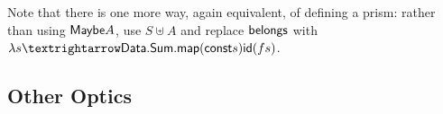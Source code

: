 \documentclass[sigplan,review,anonymous]{acmart}\settopmatter{printfolios=true,printccs=false,printacmref=false}
\begin{document}
{\begin{code}
\AgdaSymbol{(}\AgdaSpace{}%
\AgdaSymbol{)}\AgdaSpace{}%
\AgdaSpace{}%
\AgdaSpace{}%
\AgdaSpace{}%
\AgdaSymbol{(}\AgdaSpace{}%
\AgdaSpace{}%
\AgdaSymbol{)}\AgdaSpace{}%
\AgdaSymbol{|}\AgdaSpace{}%
\AgdaSpace{}%
\AgdaSymbol{(}\AgdaSpace{}%
\AgdaSymbol{)}\AgdaSpace{}%
\AgdaSymbol{(}\AgdaSpace{}%
\AgdaSpace{}%
\AgdaSymbol{)}\<%
\\
%
\>[4]\AgdaSpace{}%
\AgdaSymbol{(}\AgdaSpace{}%
\AgdaSymbol{)}\AgdaSpace{}%
\AgdaSymbol{|}\AgdaSpace{}%
\AgdaSpace{}%
\AgdaSpace{}%
\AgdaSymbol{|}\AgdaSpace{}%
\AgdaOperator{\AgdaInductiveConstructor{[}}\AgdaSpace{}%
\AgdaSpace{}%
\AgdaOperator{\AgdaInductiveConstructor{]}}\AgdaSpace{}%
\AgdaSymbol{=}\AgdaSpace{}%
\AgdaSpace{}%
\AgdaSymbol{(}\AgdaSpace{}%
\AgdaSymbol{(}\AgdaSpace{}%
\AgdaSymbol{)}\AgdaSpace{}%
\AgdaSymbol{(}\AgdaSpace{}%
\AgdaSpace{}%
\AgdaSymbol{))}\<%
\\
%
\>[4]\AgdaSpace{}%
\AgdaSymbol{(}\AgdaSpace{}%
\AgdaSymbol{)}\AgdaSpace{}%
\AgdaSymbol{|}\AgdaSpace{}%
\AgdaSpace{}%
\AgdaSymbol{|}\AgdaSpace{}%
\AgdaOperator{\AgdaInductiveConstructor{[}}\AgdaSpace{}%
\AgdaSpace{}%
\AgdaOperator{\AgdaInductiveConstructor{]}}\AgdaSpace{}%
\AgdaSymbol{=}\AgdaSpace{}%
\AgdaSpace{}%
\AgdaSymbol{(}\AgdaSpace{}%
\AgdaSymbol{(}\AgdaSpace{}%
\AgdaSymbol{(}\AgdaSpace{}%
\AgdaSymbol{)}\AgdaSpace{}%
\AgdaSymbol{(}\AgdaSpace{}%
\AgdaSpace{}%
\AgdaSymbol{)))}\<%
\end{code}
}
Note that there is one more way, again equivalent, of defining a prism:
rather than using $\AgdaRecord{Maybe} A$, use $S ⊎ A$ and replace
$\AgdaField{belongs}$ with
$\lambda s → \AgdaFunction{Data.Sum.map} (\AgdaFunction{const} s) \AgdaFunction{id} (f s)$.

\subsection{Other Optics}
\end{document}
